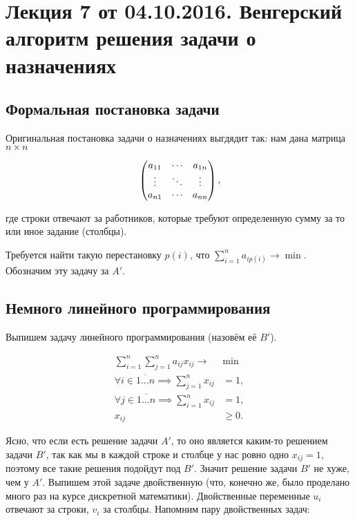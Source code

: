 \documentclass[a4paper, 12pt]{article}
\begin{document}
\pagestyle{fancy}

\section{Лекция 7 от 04.10.2016. Венгерский алгоритм решения задачи о назначениях}

\subsection{Формальная постановка задачи}
Оригинальная постановка задачи о назначениях
выгдядит так: нам дана матрица $n \times n$

\[
  \begin{pmatrix}
    a_{11} & \cdots & a_{1n} \cr 
    \vdots & \ddots & \vdots \cr 
    a_{n1} & \cdots & a_{nn}
  \end{pmatrix},
\]

где строки отвечают за работников, которые требуют определенную сумму за то
или иное задание (столбцы).

Требуется найти такую перестановку $p(i)$, что $\sum\limits_{i = 1}^{n} 
a_{ip(i)} \to \min.$  Обозначим эту задачу за $A'$.

\subsection{Немного линейного программирования}

Выпишем задачу линейного программирования (назовём её $B'$).

\begin{align*}
  \sum\limits_{i = 1}^n \sum\limits_{j = 1}^n a_{ij}x_{ij} \to & \min\\
  \forall i \in \overline{1\ldots n} \implies \sum\limits_{j = 1}^n x_{ij} &= 1,\\
  \forall j \in \overline{1\ldots n} \implies \sum\limits_{i = 1}^n x_{ij} &= 1,\\
  x_{ij} &\geqslant 0.
\end{align*}

Ясно, что если есть решение задачи $A'$, то оно является каким-то решением задачи $B'$,
так как мы в каждой строке и столбце у нас ровно одно $x_{ij} = 1$, поэтому
все такие решения подойдут под $B'$. Значит решение задачи $B'$ не хуже, чем у
$A'$. Выпишем этой задаче двойственную (что, конечно же, было проделано
много раз на курсе дискретной математики). Двойственные переменные $u_i$ отвечают
за строки, $v_i$ за столбцы. Напомним пару двойственных задач:
\end{document}
